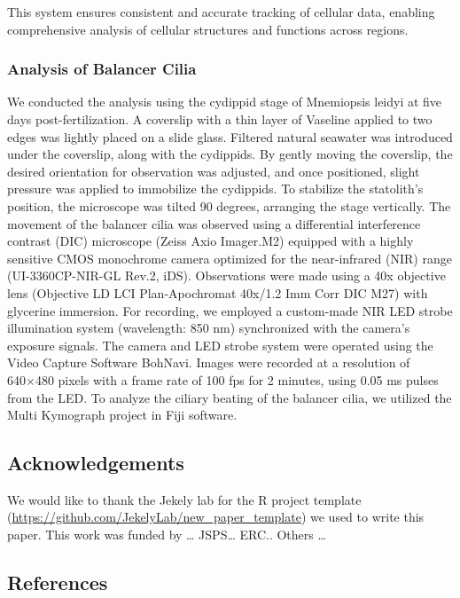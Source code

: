 \documentclass[
  11pt,
]{article}
\begin{document}
This system ensures consistent and accurate tracking of cellular data,
enabling comprehensive analysis of cellular structures and functions
across regions.

\subsubsection{Analysis of Balancer
Cilia}\label{analysis-of-balancer-cilia}

We conducted the analysis using the cydippid stage of Mnemiopsis leidyi
at five days post-fertilization. A coverslip with a thin layer of
Vaseline applied to two edges was lightly placed on a slide glass.
Filtered natural seawater was introduced under the coverslip, along with
the cydippids. By gently moving the coverslip, the desired orientation
for observation was adjusted, and once positioned, slight pressure was
applied to immobilize the cydippids. To stabilize the statolith's
position, the microscope was tilted 90 degrees, arranging the stage
vertically. The movement of the balancer cilia was observed using a
differential interference contrast (DIC) microscope (Zeiss Axio
Imager.M2) equipped with a highly sensitive CMOS monochrome camera
optimized for the near-infrared (NIR) range (UI-3360CP-NIR-GL Rev.2,
iDS). Observations were made using a 40x objective lens (Objective LD
LCI Plan-Apochromat 40x/1.2 Imm Corr DIC M27) with glycerine immersion.
For recording, we employed a custom-made NIR LED strobe illumination
system (wavelength: 850 nm) synchronized with the camera's exposure
signals. The camera and LED strobe system were operated using the Video
Capture Software BohNavi. Images were recorded at a resolution of
640×480 pixels with a frame rate of 100 fps for 2 minutes, using 0.05 ms
pulses from the LED. To analyze the ciliary beating of the balancer
cilia, we utilized the Multi Kymograph project in Fiji software.

\subsection{Acknowledgements}\label{acknowledgements}

We would like to thank the Jekely lab for the R project template
(\url{https://github.com/JekelyLab/new_paper_template}) we used to write
this paper. This work was funded by \ldots{} JSPS\ldots{} ERC.. Others
\ldots{}

\subsection{References}\label{references}
\end{document}
